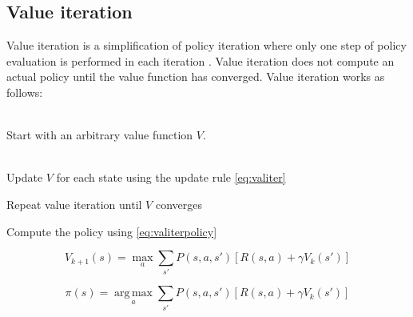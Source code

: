 \subsection{Value iteration}
\label{sec:valueiteration}

Value iteration is a simplification of policy iteration where only one step of
policy evaluation is performed in each iteration
\parencite{barto1998reinforcement}. Value iteration does not compute an actual
policy until the value function has converged. Value iteration works as follows:

\begin{description}
\item[Initialization] \hfill \\
    Start with an arbitrary value function $V$.
\item[Value iteration] \hfill \\
    Update $V$ for each state using the update rule \eqref{eq:valiter}
\item Repeat value iteration until $V$ converges
\item Compute the policy using \eqref{eq:valiterpolicy}
\end{description}

\begin{equation} \label{eq:valiter}
V_{k+1}(s) = \operatorname*{max}_a \sum_{s'}{P(s, a, s') \left[R(s, a) + \gamma V_k(s')\right]}
\end{equation}

\begin{equation} \label{eq:valiterpolicy}
\pi(s) = \operatorname*{arg\,max}_a \sum_{s'}{P(s, a, s') \left[R(s, a) + \gamma V_k(s')\right]}
\end{equation}
